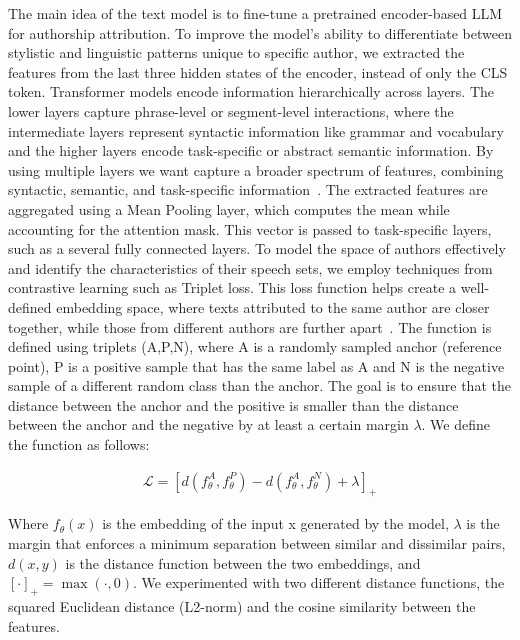 \documentclass{Interspeech}
\begin{document}
The main idea of the text model is to fine-tune a pretrained encoder-based LLM
for authorship attribution. To improve the model's ability to differentiate
between stylistic and linguistic patterns unique to specific author, we
extracted the features from the last three hidden states of the encoder,
instead of only the CLS token. Transformer models encode information
hierarchically across layers. The lower layers capture phrase-level or
segment-level interactions, where the intermediate layers represent syntactic
information like grammar and vocabulary and the higher layers encode
task-specific or abstract semantic information. By using multiple layers we
want capture a broader spectrum of features, combining syntactic, semantic, and
task-specific information~\cite{jawahar2019does}. The extracted features are
aggregated using a Mean Pooling layer, which computes the mean while accounting
for the attention mask. This vector is passed to task-specific layers, such as
a several fully connected layers. To model the space of authors effectively and
identify the characteristics of their speech sets, we employ techniques from
contrastive learning such as Triplet loss. This loss function helps create a
well-defined embedding space, where texts attributed to the same author are
closer together, while those from different authors are further
apart~\cite{mao2019metric}. The function is defined using triplets (A,P,N),
where A is a randomly sampled anchor (reference point), P is a positive sample
that has the same label as A and N is the negative sample of a different random
class than the anchor. The goal is to ensure that the distance between the
anchor and the positive is smaller than the distance between the anchor and the
negative by at least a certain margin $\lambda$. We define the function as
follows:

\begin{align}
  \mathcal{L} = [d(f_\theta^{A},f_\theta^{P}) - d(f_\theta^{A},f_\theta^{N}) + \lambda]_{+}
  \label{eq:triplet_loss}
\end{align}

Where $f_\theta(x)$ is the embedding of the input x generated by the model,
$\lambda$ is the margin that enforces a minimum separation between similar and
dissimilar pairs, $d(x,y)$ is the distance function between the two embeddings,
and $[\cdot]_{+} = \max(\cdot, 0)$. We experimented with two different distance
functions, the squared Euclidean distance (L2-norm) and the cosine similarity
between the features.
\end{document}
